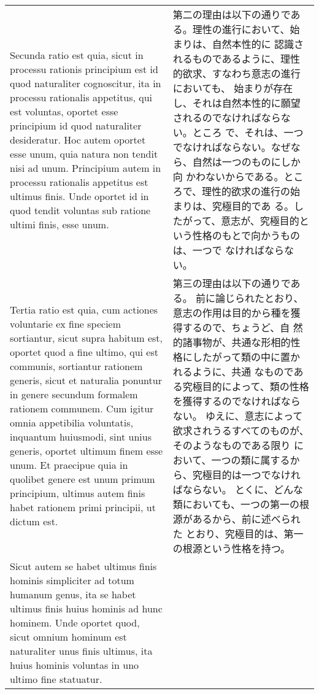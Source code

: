 \documentclass[10pt]{jsarticle} %
\begin{document}
\begin{longtable}{p{21em}p{21em}}
\\


Secunda ratio est quia, sicut in processu rationis
principium est id quod naturaliter cognoscitur, ita in processu
rationalis appetitus, qui est voluntas, oportet esse principium id quod
naturaliter desideratur. Hoc autem oportet esse unum, quia natura non
tendit nisi ad unum. Principium autem in processu rationalis appetitus
est ultimus finis. Unde oportet id in quod tendit voluntas sub ratione
ultimi finis, esse unum. 



&

第二の理由は以下の通りである。理性の進行において、始まりは、自然本性的に
 認識されるものであるように、理性的欲求、すなわち意志の進行においても、
始まりが存在し、それは自然本性的に願望されるのでなければならない。ところ
 で、それは、一つでなければならない。なぜなら、自然は一つのものにしか向
 かわないからである。ところで、理性的欲求の進行の始まりは、究極目的であ
 る。したがって、意志が、究極目的という性格のもとで向かうものは、一つで
 なければならない。

 
\\

Tertia ratio est quia, cum actiones voluntarie
ex fine speciem sortiantur, sicut supra habitum est, oportet quod a fine
ultimo, qui est communis, sortiantur rationem generis, sicut et
naturalia ponuntur in genere secundum formalem rationem communem. Cum
igitur omnia appetibilia voluntatis, inquantum huiusmodi, sint unius
generis, oportet ultimum finem esse unum. Et praecipue quia in quolibet
genere est unum primum principium, ultimus autem finis habet rationem
primi principii, ut dictum est. 


&

 第三の理由は以下の通りである。
前に論じられたとおり、意志の作用は目的から種を獲得するので、ちょうど、自
 然的諸事物が、共通な形相的性格にしたがって類の中に置かれるように、共通
 なものである究極目的によって、類の性格を獲得するのでなければならない。
ゆえに、意志によって欲求されうるすべてのものが、そのようなものである限り
 において、一つの類に属するから、究極目的は一つでなければならない。
 とくに、どんな類においても、一つの第一の根源があるから、前に述べられた
 とおり、究極目的は、第一の根源という性格を持つ。


\\

Sicut autem se habet ultimus finis
hominis simpliciter ad totum humanum genus, ita se habet ultimus finis
huius hominis ad hunc hominem. Unde oportet quod, sicut omnium hominum
est naturaliter unus finis ultimus, ita huius hominis voluntas in uno
ultimo fine statuatur.



\end{longtable}
\end{document}
